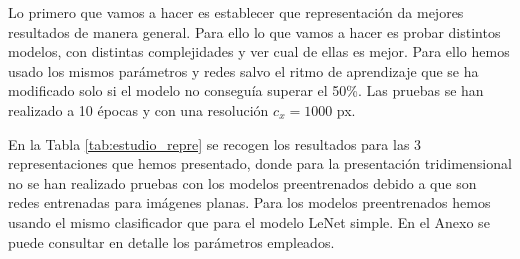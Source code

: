 \documentclass[a4paper,12pt,twoside,titlepage]{article}
\begin{document}
Lo primero que vamos a hacer es establecer que representación da mejores resultados de manera general. Para ello lo que vamos a hacer es probar distintos modelos, con distintas complejidades y ver cual de ellas es mejor. Para ello hemos usado los mismos parámetros y redes salvo el ritmo de aprendizaje que se ha modificado solo si el modelo no conseguía superar el 50\%. Las pruebas se han realizado a 10 épocas y con una resolución $c_x = 1000$ px.

En la Tabla \ref{tab:estudio_repre} se recogen los resultados para las 3 representaciones que hemos presentado, donde para la presentación tridimensional no se han realizado pruebas con los modelos preentrenados debido a que son redes entrenadas para imágenes planas. Para los modelos preentrenados hemos usando el mismo clasificador que para el modelo LeNet simple. En el Anexo se puede consultar en detalle los parámetros empleados.
\end{document}
